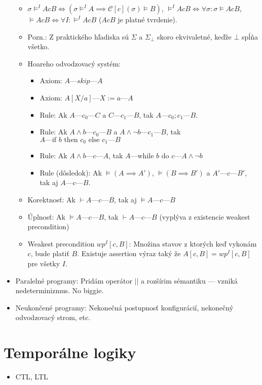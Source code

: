 \documentclass[paper=a4, fontsize=11pt]{scrartcl} %
\numberwithin{equation}{section} %
\numberwithin{figure}{section} %
\numberwithin{table}{section} %
\begin{document}
\begin{itemize}
\begin{itemize}
			\item $\sigma \models^I A c B \iff (\sigma \models^I A \implies \mathcal{C}[c](\sigma) \models B)$, $\models^I A c B \iff \forall \sigma : \sigma \models A c B$, $\models A c B \iff \forall I : \models^I A c B$ ($A c B$ je platné tvrdenie).

			
			\item Pozn.: Z praktického hľadiska sú $\Sigma$ a $\Sigma_\bot$ skoro ekvivaletné, keďže $\bot$ spĺňa všetko.
			
			\item Hoareho odvodzovacý systém:
			
			\begin{itemize}
				\item Axiom: $A—skip—A$
				\item Axiom: $A[X/a]—X := a—A$
				\item Rule: Ak $A—c_0—C$ a $C—c_1—B$, tak $A—c_0;c_1—B$.
				\item Rule: Ak $A \land b—c_0—B$ a $A \land \neg b—c_1—B$, tak $A—\text{if } b \text{ then } c_0 \text{ else } c_1—B$
				\item Rule: Ak $A \land b—c—A$, tak $A—\text{while } b \text{ do } c—A \land \neg b$
				\item Rule (dôsledok): Ak $\models (A \implies A')$, $\models (B \implies B')$ a $A'—c—B'$, tak aj $A—c—B$.
			\end{itemize}
		
			\item Korektnosť: Ak $\vdash A—c—B$, tak aj $\models A—c—B$
			\item Úplnosť: Ak $\models A—c—B$, tak $\vdash A—c—B$ (vyplýva z existencie weakest precondition)
			
			\item Weakest precondition $wp^I[c, B]$: Množina stavov z ktorých keď vykonám $c$, bude platiť $B$. Existuje assertion výraz taký že $A[c, B] = wp^I[c, B]$ pre všetky $I$.
			
		\end{itemize}
	
		\item Paralelné programy: Pridám operátor $||$ a rozšírim sémantiku — vzniká nedeterminizmus. No biggie.
		\item Neukončené programy: Nekonečná postupnosť konfigurácií, nekonečný odvodzovacý strom, etc.
		
	\end{itemize}

	\section{Temporálne logiky}
	
	\begin{itemize}
		\item CTL, LTL 
	\end{itemize}
	
\end{document}
